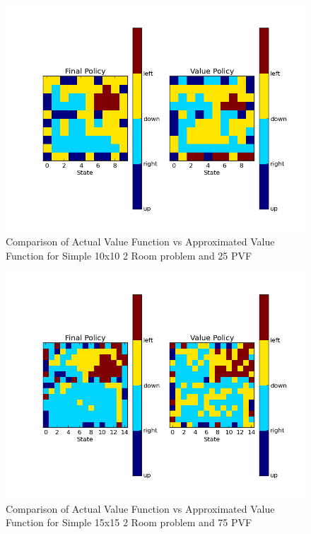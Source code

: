 \documentclass[12pt, letterpaper, final]{report}
\begin{document}
\FloatBarrier
\begin{figure}[h!]
\centering
\includegraphics[scale=.5]{images/paper_example_policy_comparison_k25_s5000_graph01.png}
\caption{Comparison of Actual Value Function vs Approximated Value
  Function for Simple 10x10 2 Room problem and 25 PVF}
\label{policy1}
\end{figure}
\FloatBarrier

\FloatBarrier
\begin{figure}[h!]
\centering
\includegraphics[scale=.5]{images/paper_example_big_policy_comparison_k75_graph01.png}
\caption{Comparison of Actual Value Function vs Approximated Value
  Function for Simple 15x15 2 Room problem and 75 PVF}
\label{policy2}
\end{figure}
\FloatBarrier
\end{document}
